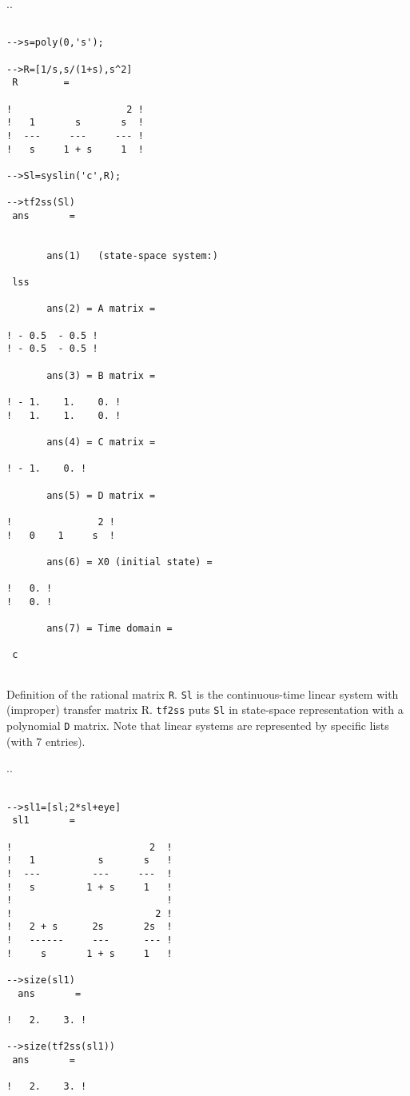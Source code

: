 \noindent.\dotfill.
\begin{verbatim}
 
-->s=poly(0,'s');
 
-->R=[1/s,s/(1+s),s^2]
 R        =
 
!                    2 !
!   1       s       s  !
!  ---     ---     --- !
!   s     1 + s     1  !
 
-->Sl=syslin('c',R);
 
-->tf2ss(Sl)
 ans       =
 
 
       ans(1)   (state-space system:)
 
 lss   
 
       ans(2) = A matrix = 
 
! - 0.5  - 0.5 !
! - 0.5  - 0.5 !
 
       ans(3) = B matrix = 
 
! - 1.    1.    0. !
!   1.    1.    0. !
 
       ans(4) = C matrix = 
 
! - 1.    0. !
 
       ans(5) = D matrix = 
 
!               2 !
!   0    1     s  !
 
       ans(6) = X0 (initial state) = 
 
!   0. !
!   0. !
 
       ans(7) = Time domain = 
 
 c   
 
\end{verbatim}
Definition of the rational matrix {\tt R}. {\tt Sl} is the
continuous-time linear system with (improper) transfer matrix
R. {\tt tf2ss} puts {\tt Sl} in state-space representation with a
polynomial {\tt D} matrix. Note that linear systems are represented
by specific lists (with 7 entries).

\noindent.\dotfill.
\begin{verbatim}
 
-->sl1=[sl;2*sl+eye]
 sl1       =
 
!                        2  !
!   1           s       s   !
!  ---         ---     ---  !
!   s         1 + s     1   !
!                           !
!                         2 !
!   2 + s      2s       2s  !
!   ------     ---      --- !
!     s       1 + s     1   !

-->size(sl1)
  ans       =
 
!   2.    3. !

-->size(tf2ss(sl1))
 ans       =
 
!   2.    3. !

\end{verbatim}

